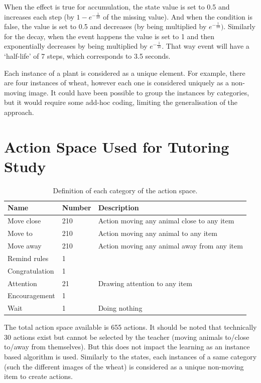 When the effect is true for accumulation, the state value is set to 0.5 and increases each step (by $1-e^{-\frac{1}{10}}$ of the missing value). And when the condition is false, the value is set to 0.5 and decreases (by being multiplied by $e^{-\frac{1}{10}})$. Similarly for the decay, when the event happens the value is set to 1 and then exponentially decreases by being multiplied by $e^{-\frac{1}{10}}$. That way event will have a `half-life' of 7 steps, which corresponds to 3.5 seconds.

Each instance of a plant is considered as a unique element. For example, there are four instances of wheat, however each one is considered uniquely as a non-moving image. It could have been possible to group the instances by categories, but it would require some add-hoc coding, limiting the generalisation of the approach.

\cleartooddpage
\chapter{Action Space Used for Tutoring Study} \label{app:action}
\begin{table}[ht]
	\centering
	\caption{Definition of each category of the action space.}
	\label{tab:tutoring_policies}
	\begin{tabularx}{\textwidth}{@{}llX@{}}\toprule
		Name & Number & Description \\
		\midrule
			Move close & 210 &  Action moving any animal close to any item\\
			Move to & 210 & Action moving any animal to any item\\
			Move away & 210 & Action moving any animal away from any item\\
			Remind rules & 1 & \\
			Congratulation & 1 & \\
			Attention & 21 & Drawing attention to any item\\
			Encouragement & 1 & \\
			Wait & 1 & Doing nothing\\
		\bottomrule
	\end{tabularx}
\end{table}

The total action space available is 655 actions. It should be noted that technically 30 actions exist but cannot be selected by the teacher (moving animals to/close to/away from themselves). But this does not impact the learning as an instance based algorithm is used. Similarly to the states, each instances of a same category (such the different images of the wheat) is considered as a unique non-moving item to create actions.


